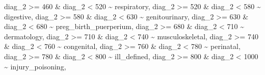 \documentclass[
]{article}
\newenvironment{Shaded}{\begin{snugshade}}{\end{snugshade}}
\newcommand{\DecValTok}[1]{\textcolor[rgb]{0.00,0.00,0.81}{#1}}
\newcommand{\NormalTok}[1]{#1}
\newcommand{\SpecialCharTok}[1]{\textcolor[rgb]{0.00,0.00,0.00}{#1}}
\newcommand{\StringTok}[1]{\textcolor[rgb]{0.31,0.60,0.02}{#1}}
\begin{document}
\begin{Shaded}
\begin{Highlighting}[]
\NormalTok{      diag\_2 }\SpecialCharTok{\textgreater{}=} \DecValTok{460} \SpecialCharTok{\&}\NormalTok{ diag\_2 }\SpecialCharTok{\textless{}} \DecValTok{520} \SpecialCharTok{\textasciitilde{}} \StringTok{\textquotesingle{}respiratory\textquotesingle{}}\NormalTok{,}
\NormalTok{      diag\_2 }\SpecialCharTok{\textgreater{}=} \DecValTok{520} \SpecialCharTok{\&}\NormalTok{ diag\_2 }\SpecialCharTok{\textless{}} \DecValTok{580} \SpecialCharTok{\textasciitilde{}} \StringTok{\textquotesingle{}digestive\textquotesingle{}}\NormalTok{,}
\NormalTok{      diag\_2 }\SpecialCharTok{\textgreater{}=} \DecValTok{580} \SpecialCharTok{\&}\NormalTok{ diag\_2 }\SpecialCharTok{\textless{}} \DecValTok{630} \SpecialCharTok{\textasciitilde{}} \StringTok{\textquotesingle{}genitourinary\textquotesingle{}}\NormalTok{,}
\NormalTok{      diag\_2 }\SpecialCharTok{\textgreater{}=} \DecValTok{630} \SpecialCharTok{\&}\NormalTok{ diag\_2 }\SpecialCharTok{\textless{}} \DecValTok{680} \SpecialCharTok{\textasciitilde{}} \StringTok{\textquotesingle{}preg\_birth\_puerperium\textquotesingle{}}\NormalTok{,}
\NormalTok{      diag\_2 }\SpecialCharTok{\textgreater{}=} \DecValTok{680} \SpecialCharTok{\&}\NormalTok{ diag\_2 }\SpecialCharTok{\textless{}} \DecValTok{710} \SpecialCharTok{\textasciitilde{}} \StringTok{\textquotesingle{}dermatology\textquotesingle{}}\NormalTok{,}
\NormalTok{      diag\_2 }\SpecialCharTok{\textgreater{}=} \DecValTok{710} \SpecialCharTok{\&}\NormalTok{ diag\_2 }\SpecialCharTok{\textless{}} \DecValTok{740} \SpecialCharTok{\textasciitilde{}} \StringTok{\textquotesingle{}musculoskeletal\textquotesingle{}}\NormalTok{,}
\NormalTok{      diag\_2 }\SpecialCharTok{\textgreater{}=} \DecValTok{740} \SpecialCharTok{\&}\NormalTok{ diag\_2 }\SpecialCharTok{\textless{}} \DecValTok{760} \SpecialCharTok{\textasciitilde{}} \StringTok{\textquotesingle{}congenital\textquotesingle{}}\NormalTok{,}
\NormalTok{      diag\_2 }\SpecialCharTok{\textgreater{}=} \DecValTok{760} \SpecialCharTok{\&}\NormalTok{ diag\_2 }\SpecialCharTok{\textless{}} \DecValTok{780} \SpecialCharTok{\textasciitilde{}} \StringTok{\textquotesingle{}perinatal\textquotesingle{}}\NormalTok{,}
\NormalTok{      diag\_2 }\SpecialCharTok{\textgreater{}=} \DecValTok{780} \SpecialCharTok{\&}\NormalTok{ diag\_2 }\SpecialCharTok{\textless{}} \DecValTok{800} \SpecialCharTok{\textasciitilde{}} \StringTok{\textquotesingle{}ill\_defined\textquotesingle{}}\NormalTok{,}
\NormalTok{      diag\_2 }\SpecialCharTok{\textgreater{}=} \DecValTok{800} \SpecialCharTok{\&}\NormalTok{ diag\_2 }\SpecialCharTok{\textless{}} \DecValTok{1000} \SpecialCharTok{\textasciitilde{}} \StringTok{\textquotesingle{}injury\_poisoning\textquotesingle{}}\NormalTok{,}

\end{Highlighting}
\end{Shaded}
\end{document}

